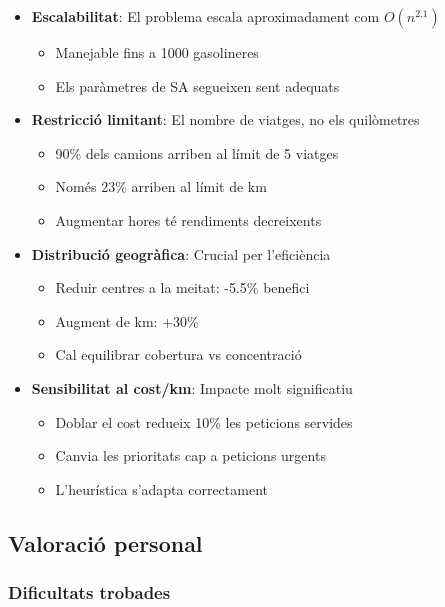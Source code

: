 \begin{itemize}
    \item \textbf{Escalabilitat}: El problema escala aproximadament com $O(n^{2.1})$
    \begin{itemize}
        \item Manejable fins a 1000 gasolineres
        \item Els paràmetres de SA segueixen sent adequats
    \end{itemize}
    
    \item \textbf{Restricció limitant}: El nombre de viatges, no els quilòmetres
    \begin{itemize}
        \item 90\% dels camions arriben al límit de 5 viatges
        \item Només 23\% arriben al límit de km
        \item Augmentar hores té rendiments decreixents
    \end{itemize}
    
    \item \textbf{Distribució geogràfica}: Crucial per l'eficiència
    \begin{itemize}
        \item Reduir centres a la meitat: -5.5\% benefici
        \item Augment de km: +30\%
        \item Cal equilibrar cobertura vs concentració
    \end{itemize}
    
    \item \textbf{Sensibilitat al cost/km}: Impacte molt significatiu
    \begin{itemize}
        \item Doblar el cost redueix 10\% les peticions servides
        \item Canvia les prioritats cap a peticions urgents
        \item L'heurística s'adapta correctament
    \end{itemize}
\end{itemize}

\subsection{Valoració personal}

\subsubsection{Dificultats trobades}

